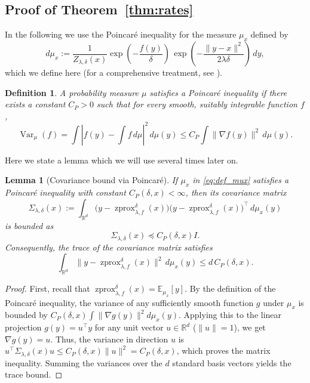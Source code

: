 \documentclass{article}
\newtheorem{definition}{Definition}
\newtheorem{lemma}{Lemma}
\newcommand{\E}{\mathbb{E}}
\newcommand{\zprox}{\ensuremath{\operatorname{zprox}}}
\begin{document}
\subsection{Proof of Theorem~\ref{thm:rates}}\label{app:proof_of_rates}

In the following we use the Poincaré inequality for the measure $\mu_x$ defined by
\begin{equation}\label{eq:def_mux}
    d\mu_x:=\frac{1}{Z_{\lambda,\delta}(x)}\exp\!\left(-\frac{f(y)}{\delta}\right)\,
\exp\!\left(-\frac{\|y-x\|^2}{2\lambda\delta}\right)\,dy,
\end{equation}
which we define here (for a comprehensive treatment, see \cite[Section 4.2]{bakry2014analysis}).

\begin{definition}
    A probability measure $\mu$ satisfies a Poincaré inequality if there exists a constant $C_P > 0$ such that for every smooth, suitably integrable function $f$,
    \[\operatorname{Var}_{\mu}(f) = \int \left|f(y)-\int f \, d\mu\right|^2\, d\mu(y)\leq C_P \int \|\nabla f(y)\|^2 \, d\mu(y).\]
\end{definition}

Here we state a lemma which we will use several times later on.

\begin{lemma}[Covariance bound via Poincaré]\label{lem:covariance_poincare}
If $\mu_x$ in \eqref{eq:def_mux} satisfies a Poincaré inequality with constant $C_P(\delta, x) < \infty$, then its covariance matrix 
\[\Sigma_{\lambda,\delta}(x) := \int_{\mathbb{R}^d}
\big(y-\zprox_{\lambda,f}^\delta(x)\big)
\big(y-\zprox_{\lambda,f}^\delta(x)\big)^\top
\,d\mu_x(y)\]
is bounded as
\begin{equation}
\Sigma_{\lambda,\delta}(x) \preceq C_P(\delta, x) I.
\end{equation}
Consequently, the trace of the covariance matrix satisfies
\[\int_{\mathbb{R}^d}
\|y-\zprox_{\lambda,f}^\delta(x)\|^2
\,d\mu_x(y)\leq d \, C_P(\delta, x).\]
\end{lemma}

\begin{proof}
First, recall that $\zprox_{\lambda,f}^\delta(x)=\E_{\mu_x}[y]$. By the definition of the Poincaré inequality, the variance of any sufficiently smooth function $g$ under $\mu_x$ is bounded by $C_P(\delta, x) \int \|\nabla g(y)\|^2 d\mu_x(y)$. Applying this to the linear projection $g(y) = u^\top y$ for any unit vector $u \in \mathbb{R}^d$ ($\|u\|=1$), we get $\nabla g(y) = u$. Thus, the variance in direction $u$ is $u^\top \Sigma_{\lambda,\delta}(x) u \leq C_P(\delta, x) \|u\|^2 = C_P(\delta, x)$, which proves the matrix inequality. Summing the variances over the $d$ standard basis vectors yields the trace bound.
\end{proof}
\end{document}
